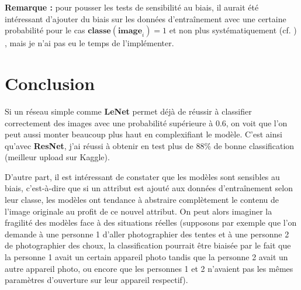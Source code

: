 \documentclass{report}
\begin{document}
\textbf{Remarque :} pour pousser les tests de sensibilité au biais, il aurait été intéressant d'ajouter du
biais sur les données d'entraînement avec une certaine probabilité pour le cas 
$\textbf{classe}(\textbf{image}_{i}) = 1$ et non plus systématiquement (cf. \cite{besse2022})
, mais je n'ai pas eu le temps de l'implémenter.

\newpage

\section{Conclusion}

Si un réseau simple comme \textbf{LeNet} permet déjà de réussir à classifier correctement des images avec une 
probabilité supérieure à 0.6, on voit que l'on peut aussi monter beaucoup plus haut en complexifiant 
le modèle. C'est ainsi qu'avec \textbf{ResNet}, j'ai réussi à obtenir en test plus de 88\% de bonne classification
(meilleur upload sur Kaggle). \newline

D'autre part, il est intéressant de constater que les modèles sont sensibles au biais, c'est-à-dire que 
si un attribut est ajouté aux données d'entraînement selon leur classe, les modèles ont tendance à 
abstraire complètement le contenu de l'image originale au profit de ce nouvel attribut. On peut alors 
imaginer la fragilité des modèles face à des situations réelles (supposons par exemple que l'on demande
à une personne 1 d'aller photographier des tentes et à une personne 2 de photographier des choux, la 
classification pourrait être biaisée par le fait que la personne 1 avait un certain appareil photo tandis
que la personne 2 avait un autre appareil photo, ou encore que les personnes 1 et 2 n'avaient pas les mêmes
paramètres d'ouverture sur leur appareil respectif).



\vspace{2cm}


\newpage

\end{document}
